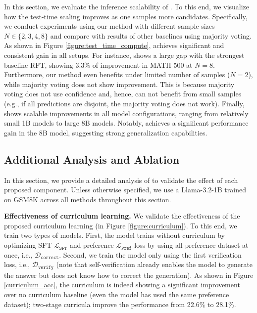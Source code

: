 In this section, we evaluate the inference scalability of \sname. To this end, we visualize how the test-time scaling improves as one samples more candidates. Specifically, we conduct experiments using our method with different sample sizes $N\in\{2,3,4,8\}$ and compare with results of other baselines using majority voting. 
As shown in Figure \ref{figure:test_time_compute}, \sname achieves significant and consistent gain in all setups. 
For instance, \sname shows a large gap with the strongest baseline RFT, showing 3.3\% of improvement in MATH-500 at $N=8$. 
Furthermore, our method even benefits under limited number of samples ($N=2$), while majority voting does not show improvement. 
This is because majority voting does not use confidence and, hence, can not benefit from small samples (e.g., if all predictions are disjoint, the majority voting does not work). 
Finally, \sname shows scalable improvements in all model configurations, ranging from relatively small 1B models to large 8B models. 
Notably, \sname achieves a significant performance gain in the 8B model, suggesting strong generalization capabilities.


\subsection{Additional Analysis and Ablation}

In this section, we provide a detailed analysis of \sname to validate the effect of each proposed component. 
Unless otherwise specified, we use a Llama-3.2-1B trained on GSM8K across all methods throughout this section.


\textbf{Effectiveness of curriculum learning.}
We validate the effectiveness of the proposed curriculum learning (in Figure \ref{figure:curriculum}). 
To this end, we train two types of models.
First, the model trains without curriculum by optimizing SFT $\mathcal{L}_{\mathtt{SFT}}$ and preference $\mathcal{L}_{\mathtt{Pref}}$ loss by using all preference dataset at once, i.e., $\mathcal{D}_{\mathtt{correct}}$. 
Second, we train the model only using the first verification loss, i.e., $\mathcal{D}_{\mathtt{verify}}$ (note that self-verification already enables the model to generate the answer but does not know how to correct the generation). 
As shown in Figure \ref{curriculum_acc}, the curriculum is indeed showing a significant improvement over no curriculum baseline (even the model has used the same preference dataset); two-stage curricula improve the performance from 22.6\% to 28.1\%.

